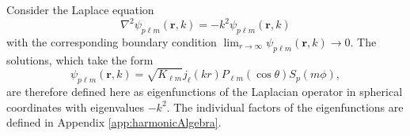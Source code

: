 
Consider the Laplace equation
\begin{equation}
\nabla^2\psi_{p\ell m}(\mathbf{r},k) = -k^2\psi_{p\ell m}(\mathbf{r},k)
\end{equation}
with the corresponding boundary condition $\lim_{r\to\infty}\psi_{p\ell m}(\mathbf{r},k)\to0$. The solutions, which take the form
\begin{equation}
\psi_{p\ell m}(\mathbf{r},k) = \sqrt{K_{\ell m}}j_\ell(kr)P_{\ell m}(\cos\theta)S_p(m\phi),
\end{equation}
are therefore defined here as eigenfunctions of the Laplacian operator in spherical coordinates with eigenvalues $-k^2$. The individual factors of the eigenfunctions are defined in Appendix \ref{app:harmonicAlgebra}. 

